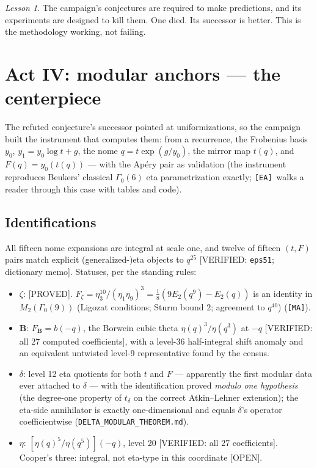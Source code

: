 \documentclass[11pt,reqno]{amsart}
\theoremstyle{plain}
\theoremstyle{definition}
\theoremstyle{remark}
\newtheorem{lesson}[theorem]{Lesson}
\newcommand{\Proved}{\textup{\textsf{[PROVED]}}}
\newcommand{\VerifiedR}[1]{\textup{\textsf{[VERIFIED: #1]}}}
\newcommand{\Open}{\textup{\textsf{[OPEN]}}}
\newcommand{\MA}{\texttt{[MA]}}
\newcommand{\EA}{\texttt{[EA]}}
\begin{document}
\begin{lesson}
The campaign's conjectures are required to make predictions, and its
experiments are designed to kill them. One died. Its successor is better.
This is the methodology working, not failing.
\end{lesson}

\section{Act IV: modular anchors --- the centerpiece}\label{sec:modular}

The refuted conjecture's successor pointed at uniformizations, so the
campaign built the instrument that computes them: from a recurrence, the
Frobenius basis $y_0$, $y_1=y_0\log t+g$, the nome
$q=t\exp(g/y_0)$, the mirror map $t(q)$, and $F(q)=y_0(t(q))$ --- with
the Ap\'ery pair as validation (the instrument reproduces Beukers'
classical $\Gamma_0(6)$ eta parametrization exactly; \EA\ walks a reader
through this case with tables and code).

\subsection{Identifications}
All fifteen nome expansions are integral at scale one, and twelve of
fifteen $(t,F)$ pairs match explicit (generalized-)eta objects to
$q^{25}$ \VerifiedR{\texttt{eps51}; dictionary memo}. Statuses,
per the standing rules:
\begin{itemize}[leftmargin=2em]
\item $\zeta$: \Proved. $F_\zeta=\eta_3^{10}/(\eta_1\eta_9)^3
=\tfrac18(9E_2(q^9)-E_2(q))$ is an identity in $M_2(\Gamma_0(9))$
(Ligozat conditions; Sturm bound $2$; agreement to $q^{40}$) (\MA).
\item $\mathbf B$: $F_{\mathbf B}=b(-q)$, the Borwein cubic theta
$\eta(q)^3/\eta(q^3)$ at $-q$ \VerifiedR{all 27 computed coefficients},
with a level-36 half-integral shift anomaly and an equivalent untwisted
level-9 representative found by the census.
\item $\delta$: level 12 eta quotients for both $t$ and $F$ ---
apparently the first modular data ever attached to $\delta$ --- with the
identification proved \emph{modulo one hypothesis} (the degree-one
property of $t_\delta$ on the correct Atkin--Lehner extension); the
eta-side annihilator is exactly one-dimensional and equals $\delta$'s
operator coefficientwise (\texttt{DELTA\_MODULAR\_THEOREM.md}).
\item $\eta$: $[\eta(q)^5/\eta(q^5)](-q)$, level 20
\VerifiedR{all 27 coefficients}. Cooper's three: integral, not eta-type
in this coordinate \Open.
\end{itemize}
\end{document}
